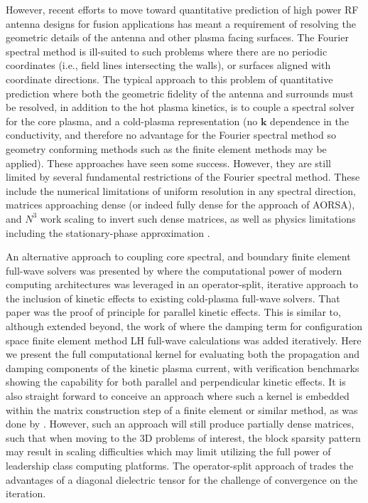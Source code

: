\documentclass[final,5p,times,twocolumn]{elsarticle}
\renewcommand{\vec}[1]{\mathbf{#1}}
\begin{document}
However, recent efforts \cite[e.g.,][]{bertelli2014,wright2015,jenkins2015} to move toward quantitative prediction of high power RF antenna designs for fusion applications has meant a requirement of resolving the geometric details of the antenna and other plasma facing surfaces. The Fourier spectral method is ill-suited to such problems where there are no periodic coordinates (i.e., field lines intersecting the walls), or surfaces aligned with coordinate directions. The typical approach to this problem of quantitative prediction where both the geometric fidelity of the antenna and surrounds must be resolved, in addition to the hot plasma kinetics, is to couple a spectral solver for the core plasma, and a cold-plasma representation (no $\vec{k}$ dependence in the conductivity, and therefore no advantage for the Fourier spectral method so geometry conforming methods such as the finite element methods may be applied). These approaches have seen some success. However, they are still limited by several fundamental restrictions of the Fourier spectral method. These include the numerical limitations of uniform resolution in any spectral direction, matrices approaching dense (or indeed fully dense for the approach of AORSA), and $N^3$ work scaling to invert such dense matrices, as well as physics limitations including the stationary-phase approximation \cite{stix,brambilla}.  

An alternative approach to coupling core spectral, and boundary finite element full-wave solvers was presented by \cite{green2014} where the computational power of modern computing architectures was leveraged in an operator-split, iterative approach to the inclusion of kinetic effects to existing cold-plasma full-wave solvers. That paper was the proof of principle for parallel kinetic effects. This is similar to, although extended beyond, the work of \cite{meneghini2009,shiraiwa2010a} where the damping term for configuration space finite element method LH full-wave calculations was added iteratively. Here we present the full computational kernel for evaluating both the propagation and damping components of the kinetic plasma current, with verification benchmarks showing the capability for both parallel and perpendicular kinetic effects. It is also straight forward to conceive an approach where such a kernel is embedded within the matrix construction step of a finite element or similar method, as was done by \cite{svidzinski2016}. However, such an approach will still produce partially dense matrices, such that when moving to the 3D problems of interest, the block sparsity pattern may result in scaling difficulties which may limit utilizing the full power of leadership class computing platforms. The operator-split approach of \cite{green2014} trades the advantages of a diagonal dielectric tensor for the challenge of convergence on the iteration.    
\end{document}
